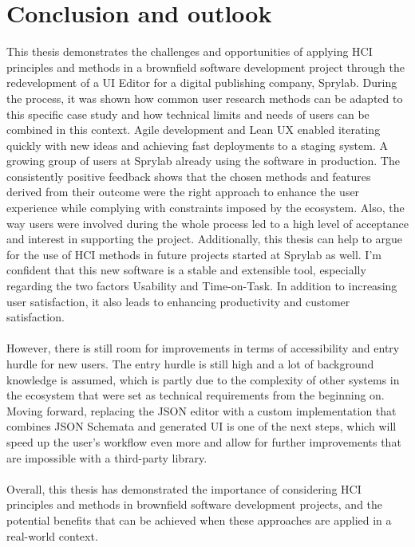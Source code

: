 %
\chapter{Conclusion and outlook}
\label{chap:conclusion}      
This thesis demonstrates the challenges and opportunities of applying HCI principles and methods in a brownfield software development project through the redevelopment of a UI Editor for a digital publishing company, Sprylab.
During the process, it was shown how common user research methods can be adapted to this specific case study and how technical limits and needs of users can be combined in this context.
Agile development and Lean UX enabled iterating quickly with new ideas and achieving fast deployments to a staging system.
A growing group of users at Sprylab already using the software in production. The consistently positive feedback shows that the chosen methods and features derived from their outcome were the right approach to enhance the user experience while complying with constraints imposed by the ecosystem.
Also, the way users were involved during the whole process led to a high level of acceptance and interest in supporting the project.
Additionally, this thesis can help to argue for the use of HCI methods in future projects started at Sprylab as well.
I'm confident that this new software is a stable and extensible tool, especially regarding the two factors Usability and Time-on-Task.
In addition to increasing user satisfaction, it also leads to enhancing productivity and customer satisfaction.
\\\\
However, there is still room for improvements in terms of accessibility and entry hurdle for new users.
The entry hurdle is still high and a lot of background knowledge is assumed, which is partly due to the complexity of other systems in the ecosystem that were set as technical requirements from the beginning on.
Moving forward, replacing the JSON editor with a custom implementation that combines JSON Schemata and generated UI is one of the next steps, which will speed up the user's
workflow even more and allow for further improvements that are impossible with a third-party library.
\\\\
Overall, this thesis has demonstrated the importance of considering HCI principles and methods in brownfield software development projects, and the potential benefits that can be achieved when these approaches are applied in a real-world context.